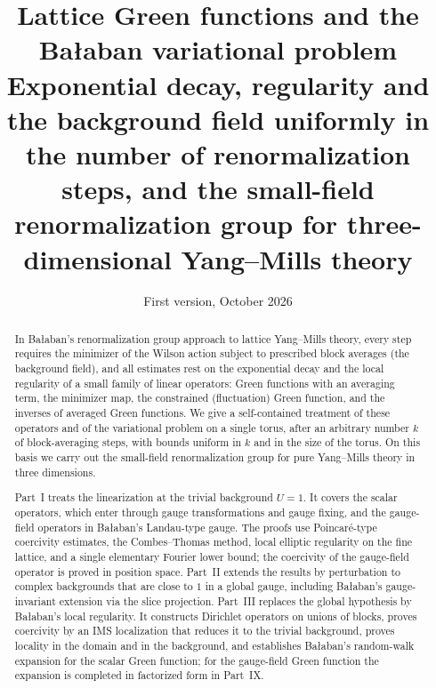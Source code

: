 \documentclass[11pt,a4paper]{article}
\title{\textbf{Lattice Green functions and the Ba\l aban variational problem}\\[6pt]
\large Exponential decay, regularity and the background field uniformly in the number of renormalization steps, and the small-field renormalization group for three-dimensional Yang--Mills theory}
\author{}
\date{First version, October 2026}
\numberwithin{equation}{section}
\theoremstyle{definition}
\theoremstyle{remark}
\begin{document}
\maketitle

\begin{abstract}
In Ba\l aban's renormalization group approach to lattice Yang--Mills theory, every step requires the minimizer of the Wilson action subject to prescribed block averages (the background field), and all estimates rest on the exponential decay and the local regularity of a small family of linear operators: Green functions with an averaging term, the minimizer map, the constrained (fluctuation) Green function, and the inverses of averaged Green functions. We give a self-contained treatment of these operators and of the variational problem on a single torus, after an arbitrary number $k$ of block-averaging steps, with bounds uniform in $k$ and in the size of the torus. On this basis we carry out the small-field renormalization group for pure Yang--Mills theory in three dimensions.

Part~I treats the linearization at the trivial background $U=1$. It covers the scalar operators, which enter through gauge transformations and gauge fixing, and the gauge-field operators in Ba\l aban's Landau-type gauge. The proofs use Poincar\'e-type coercivity estimates, the Combes--Thomas method, local elliptic regularity on the fine lattice, and a single elementary Fourier lower bound; the coercivity of the gauge-field operator is proved in position space. Part~II extends the results by perturbation to complex backgrounds that are close to $1$ in a global gauge, including Ba\l aban's gauge-invariant extension via the slice projection. Part~III replaces the global hypothesis by Ba\l aban's local regularity. It constructs Dirichlet operators on unions of blocks, proves coercivity by an IMS localization that reduces it to the trivial background, proves locality in the domain and in the background, and establishes Ba\l aban's random-walk expansion for the scalar Green function; for the gauge-field Green function the expansion is completed in factorized form in Part~IX.


\end{abstract}
\end{document}
